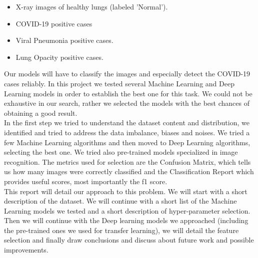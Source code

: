 \documentclass{article}
\begin{document}
\begin{itemize}
    \item X-ray images of healthy lungs (labeled 'Normal').
    \item COVID-19 positive cases
    \item  Viral Pneumonia positive cases.
    \item  Lung Opacity positive cases.
\end{itemize}
 
Our models will have to classify the images and especially detect the COVID-19 cases reliably. In this project we tested several Machine Learning and Deep Learning models in order to establish the best one for this task. We could not be exhaustive in our search, rather we selected the models with the best chances of obtaining a good result.\\
In the first step we tried to understand the dataset content and distribution, we identified and tried to address the data imbalance, biases and noises. We tried a few Machine Learning algorithms and then moved to Deep Learning algorithms, selecting the best one. We tried also pre-trained models specialized in image recognition. The metrics used for selection are the Confusion Matrix, which tells us how many images were correctly classified and the Classification Report which provides useful scores, most importantly the f1 score.\\
This report will detail our approach to this problem. We will start with a short description of the dataset. We will continue with a short list of the Machine Learning models we tested and a short description of hyper-parameter selection. Then we will continue with the Deep learning models we approached (including the pre-trained ones we used for transfer learning), we will detail the feature selection and finally draw conclusions and discuss about future work and possible improvements.  

\end{document}
